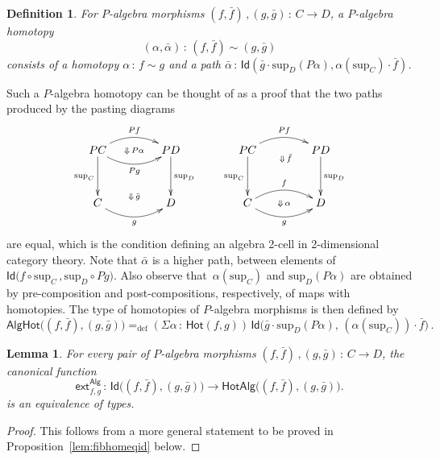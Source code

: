 \documentclass[10pt,a4paper,oneside,reqno]{amsart}
\numberwithin{equation}{section}
\theoremstyle{mythm}
\newtheorem{lemma}[theorem]{Lemma}
\theoremstyle{mydef}
\newtheorem{definition}[theorem]{Definition}
\theoremstyle{myrmk}
\newcommand{\defeq}{=_{\mathrm{def}}}
\newcommand{\co}{\,{:}\,}
\newcommand{\Hot}{\mathsf{Hot}}
\newcommand{\ext}{\mathsf{ext}}
\newcommand{\Id}{\mathsf{Id}}
\newcommand{\Palg}{\mathsf{Alg}}
\renewcommand{\sup}{\mathrm{sup}}
\newcommand{\AlgHot}{\mathsf{AlgHot}}
\begin{document}
\begin{definition}
For $P$-algebra morphisms $(f, \bar{f}) \, , (g, \bar{g}) \co C \to D$, a \emph{$P$-algebra homotopy}  
\[
(\alpha, \bar{\alpha}) \co (f, \bar{f}) \sim (g, \bar{g})
\] 
consists of a homotopy $\alpha \co f \sim g$ and a path
$\bar{\alpha} \co \Id( \bar{g} \cdot \sup_D (P \alpha) ,  \alpha(\sup_C)\cdot \bar{f})$. 
\end{definition}

Such a $P$-algebra homotopy can be thought of as a proof that the two paths produced by the pasting diagrams
\[
\xymatrix@C=1.5cm@R=1.2cm{
PC \ar@/^1pc/[r]^{Pf}   \ar[d]_{\sup_C}   \ar@/_1pc/[r]_{Pg} \ar@{}[r]|{\Downarrow \, P\alpha}
& PD \ar[d]^{\sup_D}  \\
C  \ar@/_1pc/[r]_g  \ar@{}[r]^{\Downarrow \, \bar{g}} & D }
\qquad
\xymatrix@C=1.5cm@R=1.2cm{
PC \ar@/^1pc/[r]^{Pf}   \ar[d]_{\sup_C} \ar@{}[r]_(.52){\Downarrow \, \bar{f}}  & PD \ar[d]^{\sup_D}  \\
C \ar@/^1pc/[r]^f  \ar@/_1pc/[r]_g  \ar@{}[r]|{\Downarrow \, \alpha} & D }
\]
are equal, which is the condition defining an algebra 2-cell in 2-dimensional category theory. Note that $\bar{\alpha}$ is a higher path, between elements of 
$\Id \big( f \circ \sup_C \, ,  \sup_D \circ Pg \big)$. Also observe that~$\alpha(\sup_C)$ and $\sup_D(P \alpha)$ are obtained by pre-composition and post-compositions, respectively, of maps with homotopies.  The type of homotopies of $P$-algebra morphisms is then defined by
\[
\AlgHot \big( (f,\bar{f}), (g, \bar{g})  \big)
 \defeq  
(\Sigma \alpha \co \Hot(  f , g)) \, \Id\big( \bar{g} \cdot \sup_D(P \alpha),\, (\alpha(\sup_C))\cdot \bar{f} \big) \, .
\]


\newcommand{\HotAlg}{\mathsf{HotAlg}}


\begin{lemma}\label{IdEqHo}
For every pair of $P$-algebra morphisms $(f, \bar{f}) \, , (g, \bar{g}) \co C \to D$,  
the canonical function
\[
\ext^{\Palg}_{f,g}  \co 
\Id\big((f, \bar{f}), (g, \bar{g})\big) \to \HotAlg \big((f, \bar{f}), (g, \bar{g})\big).
\]
 is an equivalence of types. 
\end{lemma}

\begin{proof}
This follows from a more general statement to be proved in Proposition~\ref{lem:fibhomeqid} below.
\end{proof}
\end{document}
